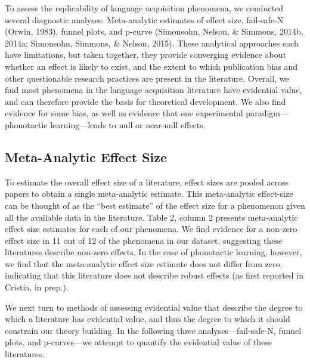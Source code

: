 \documentclass[english,floatsintext,man]{apa6}
\theoremstyle{definition}
\theoremstyle{definition}
\theoremstyle{remark}
\begin{document}
To assess the replicability of language acquisition phenomena, we
conducted several diagnostic analyses: Meta-analytic estimates of effect
size, fail-safe-N (Orwin, 1983), funnel plots, and p-curve (Simonsohn,
Nelson, \& Simmons, 2014b, 2014a; Simonsohn, Simmons, \& Nelson, 2015).
These analytical approaches each have limitations, but taken together,
they provide converging evidence about whether an effect is likely to
exist, and the extent to which publication bias and other questionable
research practices are present in the literature. Overall, we find most
phenomena in the language acquisition literature have evidential value,
and can therefore provide the basis for theoretical development. We also
find evidence for some bias, as well as evidence that one experimental
paradigm---phonotactic learning---leads to null or near-null effects.

\subsection{Meta-Analytic Effect Size}\label{meta-analytic-effect-size}

To estimate the overall effect size of a literature, effect sizes are
pooled across papers to obtain a single meta-analytic estimate. This
meta-analytic effect-size can be thought of as the \enquote{best
estimate} of the effect size for a phenomenon given all the available
data in the literature. Table 2, column 2 presents meta-analytic effect
size estimates for each of our phenomena. We find evidence for a
non-zero effect size in 11 out of 12 of the phenomena in our dataset,
suggesting these literatures describe non-zero effects. In the case of
phonotactic learning, however, we find that the meta-analytic effect
size estimate does not differ from zero, indicating that this literature
does not describe robust effects (as first reported in Cristia, in
prep.).

We next turn to methods of assessing evidential value that describe the
degree to which a literature has evidential value, and thus the degree
to which it should constrain our theory building. In the following three
analyses---fail-safe-N, funnel plots, and p-curves---we attempt to
quantify the evidential value of these literatures.
\end{document}
